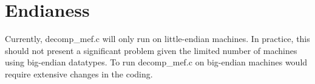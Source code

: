 \documentclass{article}
\begin{document}
\section{Endianess}
Currently, decomp\_mef.c will only run on little-endian machines. In practice, this should not present a significant problem given the limited number of machines using big-endian datatypes. To run decomp\_mef.c on big-endian machines would require extensive changes in the coding. 
\end{document}
